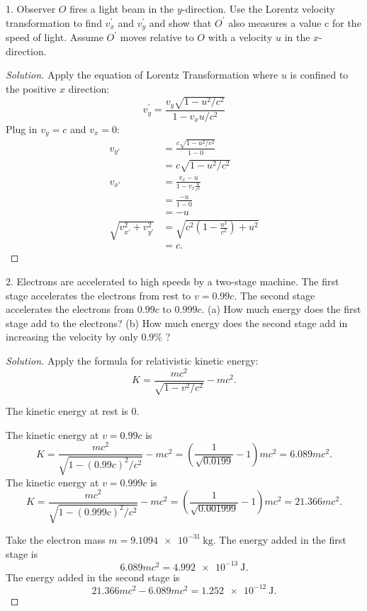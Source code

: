
1. Observer $O$ fires a light beam in the $y$-direction. Use the Lorentz velocity transformation to find $v^{\prime}_x$ and $v^{\prime}_y$ and show that $O^{\prime}$ also measures a value c for the speed of light. Assume $O^{\prime}$ moves relative to $O$ with a velocity $u$ in the $x$-direction.
\begin{proof}[Solution]
	Apply the equation of Lorentz Transformation where $u$ is confined to the positive $x$ direction:
	\[
		v_y^{\prime}=\frac{v_y \sqrt{1-u^2 / c^2}}{1-v_x u / c^2}
	\]
	Plug in  $v_y = c$ and $v_x = 0$:
	 \begin{align*}
		 v_{y'} &= \frac{c \sqrt{1-u^2 / c^2} }{1 - 0}\\
		 &= c \sqrt{1-u^2 / c^2}\\
		 v_{x'} &= \frac{v_{x}- u}{1-v_x \frac{u}{c^2}} \\
		 &= \frac{-u}{1-0}\\
		 &= -u \\
	 \sqrt{v_{x'}^2 + v_{y'}^2} &= \sqrt{ c^{2}\left( 1-\frac{u^2}{c^2} \right) + u^2 }   \\ 
		 &= c
	.\end{align*} 
\end{proof}


2. Electrons are accelerated to high speeds by a two-stage machine. The first stage accelerates the electrons from rest to $v=0.99 c$. The second stage accelerates the electrons from $0.99 c$ to $0.999 c$. (a) How much energy does the first stage add to the electrons? (b) How much energy does the second stage add in increasing the velocity by only $0.9 \%$ ?
\begin{proof}[Solution]
	Apply the formula for relativistic kinetic energy: \[
		K=\frac{m c^2}{\sqrt{1-v^2 / c^2}}-m c^2
	.\] 
	
	The kinetic energy at rest is $0$.

	The kinetic energy at $v = 0.99 c$ is
	\[
		K=\frac{m c^2}{\sqrt{1-(0.99 c)^2 / c^2}} -m c^2 = \left( \frac{1}{\sqrt{ 0.0199}}-1 \right) mc^2 = 6.089 m c^2
	.\] 
	The kinetic energy at $v = 0.999 c $ is 
	\[
		K=\frac{m c^2}{\sqrt{1-(0.999 c)^2 / c^2}}-m c^2 = \left( \frac{1}{\sqrt{ 0.001999}}-1 \right) mc^2 = 21.366 m c^2
	.\] 

	Take the electron mass $m = \SI{9.1094e-31}{\kilogram}$. The energy added in the first stage is 
	\[
		6.089 m c^2 = \SI{4.992e-13}{\joule}
	.\] 
	The energy added in the second stage is \[
		21.366 m c^2 -6.089 m c^2 = \SI{1.252e-12}{\joule} 
	.\] 
\end{proof}

